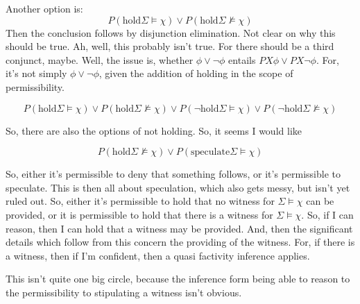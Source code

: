 \documentclass[10pt]{article}
\begin{document}
Another option is:
\[
  P(\text{hold} \Sigma \vDash \chi) \lor P(\text{hold}\Sigma \nvDash \chi)
\]
Then the conclusion follows by disjunction elimination.
Not clear on why this should be true.
Ah, well, this probably isn't true.
For there should be a third conjunct, maybe.
Well, the issue is, whether \(\phi \lor \lnot\phi\) entails \(PX\phi \lor PX\lnot\phi\).
For, it's not simply \(\phi \lor \lnot\phi\), given the addition of holding in the scope of permissibility.

\[
  P(\text{hold} \Sigma \vDash \chi) \lor P(\text{hold}\Sigma \nvDash \chi) \lor P(\lnot\text{hold} \Sigma \vDash \chi) \lor P(\lnot\text{hold}\Sigma \nvDash \chi)
\]

So, there are also the options of not holding.
So, it seems I would like

\[
  P(\text{hold}\Sigma \nvDash \chi) \lor P(\text{speculate}\Sigma \vDash \chi)
\]

So, either it's permissible to deny that something follows, or it's permissible to speculate.
This is then all about speculation, which also gets messy, but isn't yet ruled out.
So, either it's permissible to hold that no witness for \(\Sigma \vDash \chi\) can be provided, or it is permissible to hold that there is a witness for \(\Sigma \vDash \chi\).
So, if I can reason, then I can hold that a witness may be provided.
And, then the significant details which follow from this concern the providing of the witness.
For, if there is a witness, then if I'm confident, then a quasi factivity inference applies.

This isn't quite one big circle, because the inference form being able to reason to the permissibility to stipulating a witness isn't obvious.

\newpage

\printbibliography
\end{document}
